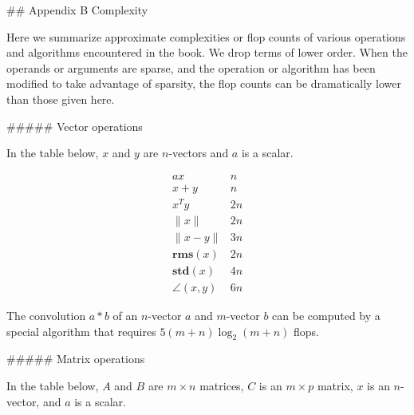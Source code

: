 

## Appendix B Complexity

Here we summarize approximate complexities or flop counts of various operations and algorithms encountered in the book. We drop terms of lower order. When the operands or arguments are sparse, and the operation or algorithm has been modified to take advantage of sparsity, the flop counts can be dramatically lower than those given here.

##### Vector operations

In the table below, \(x\) and \(y\) are \(n\)-vectors and \(a\) is a scalar.

\[\begin{array}{ll}ax&n\\ x+y&n\\ x^{T}y&2n\\ \|x\|&2n\\ \|x-y\|&3n\\ \mathbf{rms}(x)&2n\\ \mathbf{std}(x)&4n\\ \angle(x,y)&6n\end{array}\]

The convolution \(a*b\) of an \(n\)-vector \(a\) and \(m\)-vector \(b\) can be computed by a special algorithm that requires \(5(m+n)\log_{2}(m+n)\) flops.

##### Matrix operations

In the table below, \(A\) and \(B\) are \(m\times n\) matrices, \(C\) is an \(m\times p\) matrix, \(x\) is an \(n\)-vector, and \(a\) is a scalar.

